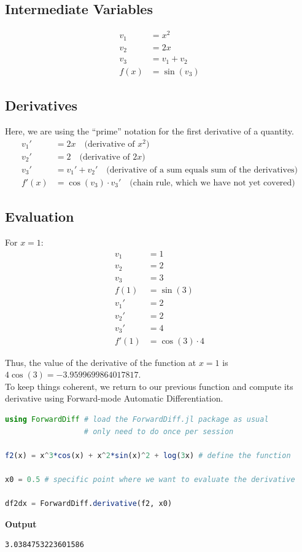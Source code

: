 \subsection*{Intermediate Variables}
\begin{align*}
v_1 &= x^2 \\
v_2 &= 2x \\
v_3 &= v_1 + v_2 \\
f(x) &= \sin(v_3)
\end{align*}

\subsection*{Derivatives}
Here, we are using the ``prime'' notation for the first derivative of a quantity.
\begin{align*}
v_1' &= 2x \quad \text{(derivative of } x^2 \text{)} \\
v_2' &= 2 \quad \text{(derivative of } 2x \text{)} \\
v_3' &= v_1' + v_2' \quad \text{(derivative of a sum equals sum of the derivatives)}  \\
f'(x) &= \cos(v_3) \cdot v_3' \quad \text{(chain rule, which we have not yet covered)} 
\end{align*}

\subsection*{Evaluation}
For $ x = 1 $:
\begin{align*}
v_1 &= 1 \\
v_2 &= 2 \\
v_3 &= 3 \\
f(1) &= \sin(3) \\
v_1' &= 2 \\
v_2' &= 2 \\
v_3' &= 4 \\
f'(1) &= \cos(3) \cdot 4
\end{align*}

Thus, the value of the derivative of the function at $x = 1$ is $4\cos(3)=-3.9599699864017817$.\\

To keep things coherent, we return to our previous function and compute its derivative using Forward-mode Automatic Differentiation.


\begin{lstlisting}[language=Julia,style=mystyle]
using ForwardDiff # load the ForwardDiff.jl package as usual
                  # only need to do once per session

f2(x) = x^3*cos(x) + x^2*sin(x)^2 + log(3x) # define the function

x0 = 0.5 # specific point where we want to evaluate the derivative

df2dx = ForwardDiff.derivative(f2, x0)
\end{lstlisting}
\textbf{Output} 
\begin{verbatim}
3.0384753223601586
\end{verbatim}

